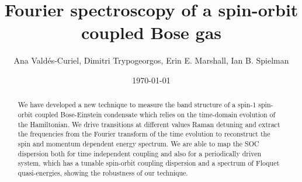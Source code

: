 \documentclass[12pt]{iopart}
\begin{document}
		
\title{Fourier spectroscopy of a spin-orbit coupled Bose gas}
	
\author{Ana Vald\'es-Curiel, Dimitri Trypogeorgos, Erin E. Marshall, Ian B. Spielman}
\address{Joint Quantum Institute, University of Maryland and National Institute of Standards and Technology, College Park, Maryland, 20742, USA}
\date{\today}

\begin{abstract}
	
	 We have developed a new technique to measure the band structure of a spin-1 spin-orbit coupled Bose-Einstein condensate which relies on the time-domain evolution of the Hamiltonian. We drive transitions at different values Raman detuning and extract the frequencies from the Fourier transform of the time evolution to reconstruct the spin and momentum dependent energy spectrum. We are able to map the SOC dispersion both for time independent coupling and also for a periodically driven system, which has a tunable spin-orbit coupling dispersion and a spectrum of Floquet quasi-energies, showing the robustness of our technique.
	 
\end{abstract}

\maketitle









%


\end{document}
